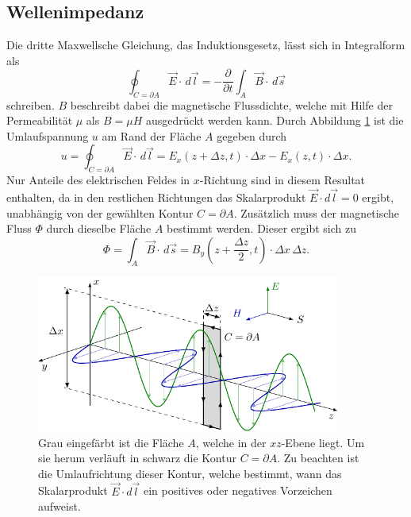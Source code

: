 \subsection{Wellenimpedanz}
\label{opt:subsection:wave_impedance}
Die dritte Maxwellsche Gleichung, das Induktionsgesetz, lässt sich in Integralform als
\begin{equation}
\oint_{C=\partial A} \vec{E} \cdot\, d\vec{l}
=
-\frac{\partial}{\partial t} \int_{A} \vec{B} \cdot\, d\vec{s}
\label{opt:equation:maxwell_3}
\end{equation}
schreiben.
$B$ beschreibt dabei die magnetische Flussdichte, welche mit Hilfe der Permeabilität $\mu$ als $B = \mu H$ ausgedrückt werden kann.
Durch Abbildung \ref{opt:fig:electromagnetic_wave_2} ist die Umlaufspannung $u$ am Rand der Fläche $A$ gegeben durch
\begin{equation}
u
=
\oint_{C=\partial A} \vec{E} \cdot\, d\vec{l}
=
E_x(z+\Delta z,t) \cdot \Delta x - E_x(z,t) \cdot \Delta x
.
\label{opt:equation:induced_voltage}
\end{equation}
Nur Anteile des elektrischen Feldes in $x$-Richtung sind in diesem Resultat enthalten, da in den restlichen Richtungen das Skalarprodukt $\vec{E} \cdot d\vec{l} = 0$ ergibt, unabhängig von der gewählten Kontur $C = \partial A$.
Zusätzlich muss der magnetische Fluss $\Phi$ durch dieselbe Fläche $A$ bestimmt werden.
Dieser ergibt sich zu
\begin{equation}
\Phi
=
\int_{A} \vec{B} \cdot\, d\vec{s}
=
B_y\left(z+\frac{\Delta z}{2},t\right) \cdot \Delta x \,\Delta z
.
\label{opt:equation:magnetic_flux}
\end{equation}

\begin{figure}
    \centering
    \includegraphics[width=100mm]{papers/opt/images/electromagnetic_wave_2.pdf}
    \caption{Grau eingefärbt ist die Fläche $A$, welche in der $xz$-Ebene liegt.
    Um sie herum verläuft in schwarz die Kontur $C = \partial A$.
    Zu beachten ist die Umlaufrichtung dieser Kontur, welche bestimmt, wann das Skalarprodukt $\vec{E} \cdot d\vec{l}$ ein positives oder negatives Vorzeichen aufweist.}
    \label{opt:fig:electromagnetic_wave_2}
\end{figure}

